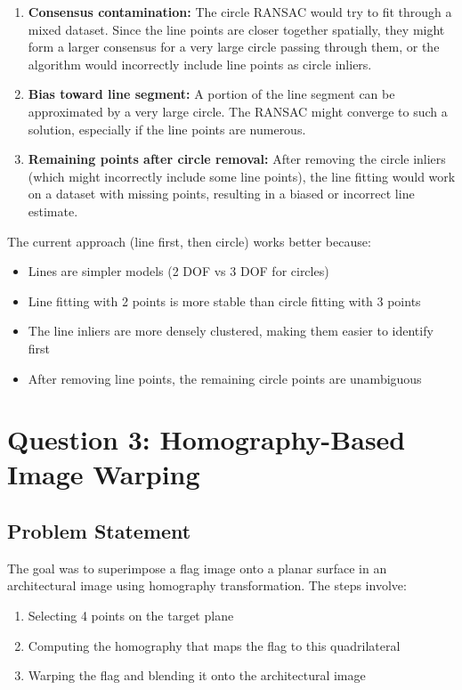 \documentclass[11pt,a4paper]{article}
\begin{document}
\begin{enumerate}
    \item \textbf{Consensus contamination:} The circle RANSAC would try to fit through a mixed dataset. Since the line points are closer together spatially, they might form a larger consensus for a very large circle passing through them, or the algorithm would incorrectly include line points as circle inliers.
    
    \item \textbf{Bias toward line segment:} A portion of the line segment can be approximated by a very large circle. The RANSAC might converge to such a solution, especially if the line points are numerous.
    
    \item \textbf{Remaining points after circle removal:} After removing the circle inliers (which might incorrectly include some line points), the line fitting would work on a dataset with missing points, resulting in a biased or incorrect line estimate.
\end{enumerate}

The current approach (line first, then circle) works better because:
\begin{itemize}
    \item Lines are simpler models (2 DOF vs 3 DOF for circles)
    \item Line fitting with 2 points is more stable than circle fitting with 3 points
    \item The line inliers are more densely clustered, making them easier to identify first
    \item After removing line points, the remaining circle points are unambiguous
\end{itemize}

\section{Question 3: Homography-Based Image Warping}

\subsection{Problem Statement}
The goal was to superimpose a flag image onto a planar surface in an architectural image using homography transformation. The steps involve:
\begin{enumerate}
    \item Selecting 4 points on the target plane
    \item Computing the homography that maps the flag to this quadrilateral
    \item Warping the flag and blending it onto the architectural image
\end{enumerate}
\end{document}
